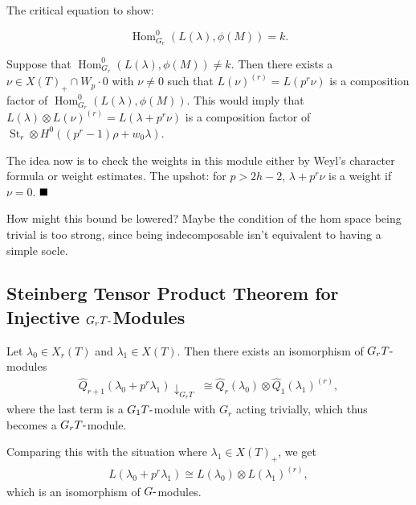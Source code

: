 The critical equation to show:

\begin{equation} {\operatorname{Hom}}_{G_r}^0 (L(\lambda), \phi(M)) = k .\end{equation}

Suppose that
\({\operatorname{Hom}}_{G_r}^0 (L(\lambda), \phi(M)) \neq k\). Then
there exists a \(\nu\in X(T)_+ \cap W_p \cdot 0\) with \(\nu\neq 0\)
such that \(L(\nu)^{(r)} = L(p^r \nu)\) is a composition factor of
\({\operatorname{Hom}}_{G_r}^0 (L(\lambda), \phi(M))\). This would imply
that \(L(\lambda) \otimes L(\nu)^{(r)} = L(\lambda+ p^r\nu)\) is a
composition factor of
\(\operatorname{St}_r \otimes H^0( (p^r-1)\rho + w_0 \lambda)\).

The idea now is to check the weights in this module either by Weyl's
character formula or weight estimates. The upshot: for \(p>2h-2\),
\(\lambda+ p^r \nu\) is a weight if \(\nu = 0\). \(\hfill\blacksquare\)

How might this bound be lowered? Maybe the condition of the hom space
being trivial is too strong, since being indecomposable isn't equivalent
to having a simple socle.

\hypertarget{steinberg-tensor-product-theorem-for-injective-g_r-thbox-modules}{%
\subsection{\texorpdfstring{Steinberg Tensor Product Theorem for
Injective
\(G_r T{\hbox{-}}\)Modules}{Steinberg Tensor Product Theorem for Injective G\_r T\{\textbackslash hbox\{-\}\}Modules}}\label{steinberg-tensor-product-theorem-for-injective-g_r-thbox-modules}}

\begin{proposition}[?]

Let \(\lambda_0 \in X_r(T)\) and \(\lambda_1 \in X(T)\). Then there
exists an isomorphism of \(G_r T{\hbox{-}}\)modules
\begin{align*}  
\widehat{Q}_{r+1}(\lambda_0 + p^r \lambda_1)\downarrow_{G_r T} 
\,\, \cong \widehat{Q}_r(\lambda_0) \otimes\widehat{Q}_1(\lambda_1)^{(r)}
,\end{align*}
where the last term is a \(G_1 T{\hbox{-}}\)module with \(G_r\) acting
trivially, which thus becomes a \(G_r T{\hbox{-}}\)module.

\end{proposition}

\begin{remark}

Comparing this with the situation where \(\lambda_1 \in X(T)_+\), we get
\begin{align*}  
L(\lambda_0 + p^r \lambda_1) 
\cong L(\lambda_0) \otimes L(\lambda_1)^{(r)}
,\end{align*}
which is an isomorphism of \(G{\hbox{-}}\)modules.

\end{remark}

